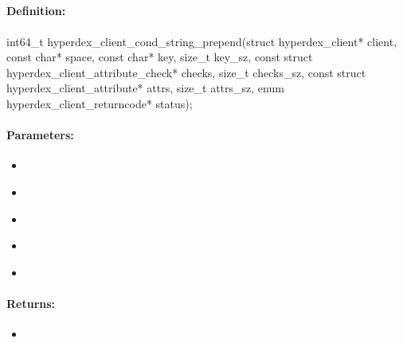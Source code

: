 \pagebreak
\subsection{}
\label{api:c:cond_string_prepend}


\paragraph{Definition:}
\begin{ccode}
int64_t hyperdex_client_cond_string_prepend(struct hyperdex_client* client,
        const char* space,
        const char* key, size_t key_sz,
        const struct hyperdex_client_attribute_check* checks, size_t checks_sz,
        const struct hyperdex_client_attribute* attrs, size_t attrs_sz,
        enum hyperdex_client_returncode* status);
\end{ccode}

\paragraph{Parameters:}
\begin{itemize}[noitemsep]
\item {}\\

\item {}\\

\item {}\\

\item {}\\

\item {}\\

\end{itemize}

\paragraph{Returns:}
\begin{itemize}[noitemsep]
\item {}\\

\end{itemize}

